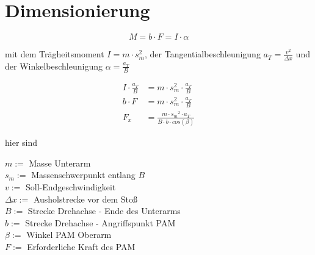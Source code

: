 \chapter{Dimensionierung}

\begin{equation}
M = b \cdot F = I \cdot \alpha
\end{equation}

mit dem Trägheitsmoment \( I = m \cdot s_m^2 \), der Tangentialbeschleunigung \( a_T = \frac{v^2}{\Delta x} \) und der
Winkelbeschleunigung \( \alpha = \frac{a_T}{B} \) \par\medskip

\begin{align*}
I \cdot \frac{a_T}{B} &= m \cdot s_m^2 \cdot \frac{a_T}{B} \\
b \cdot F &= m \cdot s_m^2 \cdot \frac{a_T}{B} \\
F_x &=\frac{m \cdot {s_m}^2 \cdot a_T}{B \cdot b \cdot cos(\beta)}
\end{align*}

hier sind

\( m := \) Masse Unterarm \\
\( s_m := \) Massenschwerpunkt entlang $ B $ \\
\( v := \) Soll-Endgeschwindigkeit \\
\( \Delta x := \) Ausholstrecke vor dem Stoß \\
\( B := \) Strecke Drehachse - Ende des Unterarms \\
\( b:= \) Strecke Drehachse - Angriffspunkt PAM \\
\( \beta := \) Winkel PAM  Oberarm \\
\( F:= \) Erforderliche Kraft des PAM
